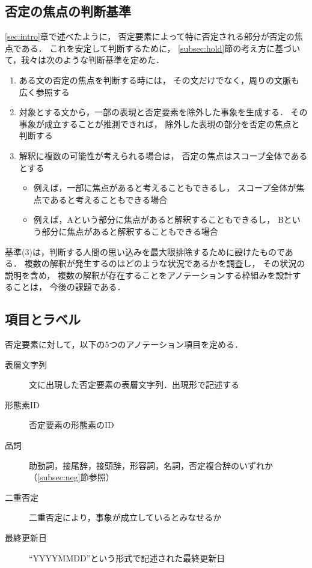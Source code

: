 \documentclass[japanese]{jnlp_1.4}
\begin{document}
\subsection{否定の焦点の判断基準}
\label{subsec:guideline}

\ref{sec:intro}章で述べたように，
否定要素によって特に否定される部分が否定の焦点である．
これを安定して判断するために，
\ref{subsec:hold}節の考え方に基づいて，我々は次のような判断基準を定めた．
\begin{enumerate}
\item ある文の否定の焦点を判断する時には，
その文だけでなく，周りの文脈も広く参照する
\item 対象とする文から，一部の表現と否定要素を除外した事象を生成する．
  その事象が成立することが推測できれば，
  除外した表現の部分を否定の焦点と判断する
\item 解釈に複数の可能性が考えられる場合は，
  否定の焦点はスコープ全体であるとする
\begin{itemize}
\item 例えば，一部に焦点があると考えることもできるし，
  スコープ全体が焦点であると考えることもできる場合
\item 例えば，Aという部分に焦点があると解釈することもできるし，
  Bという部分に焦点があると解釈することもできる場合
\end{itemize} 
\end{enumerate}
基準(3)は，判断する人間の思い込みを最大限排除するために設けたものである．
複数の解釈が発生するのはどのような状況であるかを調査し，
その状況の説明を含め，
複数の解釈が存在することをアノテーションする枠組みを設計することは，
今後の課題である．


\subsection{項目とラベル}
\label{subsec:label}

否定要素に対して，以下の5つのアノテーション項目を定める．
\begin{description}
\item[表層文字列] 文に出現した否定要素の表層文字列．出現形で記述する
\item[形態素ID] 否定要素の形態素のID
\item[品詞] 助動詞，接尾辞，接頭辞，形容詞，名詞，否定複合辞のいずれか
  （\ref{subsec:neg}節参照）
\item[二重否定] 二重否定により，事象が成立しているとみなせるか
\item[最終更新日] ``YYYYMMDD''という形式で記述された最終更新日
\end{description}
\end{document}
